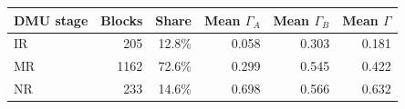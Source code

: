 \begin{tabular}{lrrrrr}
\hline
DMU stage & Blocks & Share & Mean $\Gamma_A$ & Mean $\Gamma_B$ & Mean $\Gamma$ \\
\hline
IR & 205 & 12.8\% & 0.058 & 0.303 & 0.181 \\
MR & 1162 & 72.6\% & 0.299 & 0.545 & 0.422 \\
NR & 233 & 14.6\% & 0.698 & 0.566 & 0.632 \\
\hline
\end{tabular}
